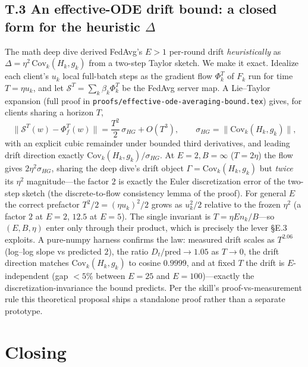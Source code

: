 \documentclass[11pt]{article}
\begin{document}
\subsection*{T.3 An effective-ODE drift bound: a closed form for the heuristic $\Delta$}

The math deep dive derived FedAvg's $E>1$ per-round drift \emph{heuristically} as $\Delta=\eta^2\,\mathrm{Cov}_k(H_k,g_k)$ from a two-step Taylor sketch. We make it exact. Idealize each client's $u_k$ local full-batch steps as the gradient flow $\Phi_k^{T}$ of $F_k$ run for time $T=\eta u_k$, and let $\mathcal S^{T}=\sum_k\beta_k\Phi_k^{T}$ be the FedAvg server map. A Lie--Taylor expansion (full proof in \texttt{proofs/effective-ode-averaging-bound.tex}) gives, for clients sharing a horizon $T$,
\begin{equation}
\big\lVert \mathcal S^{T}(w)-\Phi_f^{T}(w)\big\rVert=\frac{T^2}{2}\,\sigma_{HG}+O(T^3),
\qquad \sigma_{HG}=\big\lVert\mathrm{Cov}_k(H_k,g_k)\big\rVert,
\end{equation}
with an explicit cubic remainder under bounded third derivatives, and leading drift direction exactly $\mathrm{Cov}_k(H_k,g_k)/\sigma_{HG}$. At $E=2,B=\infty$ ($T=2\eta$) the flow gives $2\eta^2\sigma_{HG}$, sharing the deep dive's drift object $\Gamma=\mathrm{Cov}_k(H_k,g_k)$ but \emph{twice} its $\eta^2$ magnitude---the factor $2$ is exactly the Euler discretization error of the two-step sketch (the discrete-to-flow consistency lemma of the proof). For general $E$ the correct prefactor $T^2/2=(\eta u_k)^2/2$ grows as $u_k^2/2$ relative to the frozen $\eta^2$ (a factor $2$ at $E=2$, $12.5$ at $E=5$). The single invariant is $T=\eta E n_k/B$---so $(E,B,\eta)$ enter only through their product, which is precisely the lever \S E.3 exploits. A pure-numpy harness confirms the law: measured drift scales as $T^{2.06}$ (log--log slope vs predicted $2$), the ratio $D_t/\text{pred}\to1.05$ as $T\to0$, the drift direction matches $\mathrm{Cov}_k(H_k,g_k)$ to cosine $0.9999$, and at fixed $T$ the drift is $E$-independent (gap $<5\%$ between $E{=}25$ and $E{=}100$)---exactly the discretization-invariance the bound predicts. Per the skill's proof-vs-measurement rule this theoretical proposal ships a standalone proof rather than a separate prototype.

\section*{Closing}
\end{document}
